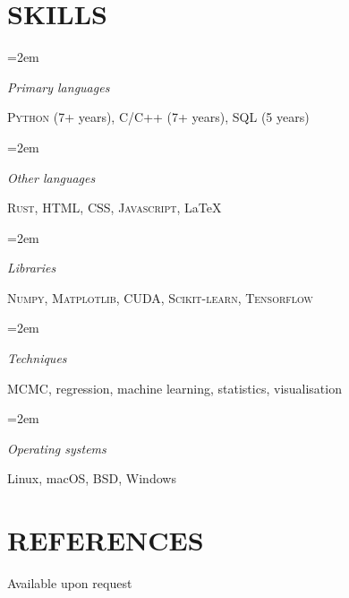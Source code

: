 \documentclass[paper=a4,fontsize=11pt]{scrartcl} %
\newlength{\spacebox}
\newlength{\skillbox}
\newcommand{\NewPart}[1]{\section*{\uppercase{#1}}}
\newcommand{\PersonalEntry}[2]{
		\noindent\hangindent=2em\hangafter=0 %
		\parbox{\spacebox}{        %
		\textit{#1}}		       %
		\hspace{1.5em} #2 \par}    %
\newcommand{\SkillsEntry}[2]{      %
		\noindent\hangindent=2em\hangafter=0 %
		\parbox{\skillbox}{        %
		\textit{#1}}			   %
		\hspace{1.5em} #2 \par}    %
\begin{document}
\NewPart{Skills}{}

\SkillsEntry{Primary \mbox{languages}}{\textsc{Python} (7+ years), \textsc{C/C++} (7+ years), \textsc{SQL} (5 years)}
\SkillsEntry{Other \mbox{languages}}{\textsc{Rust}, \textsc{HTML}, \textsc{CSS}, \textsc{Javascript}, \LaTeX}
\SkillsEntry{Libraries}{\textsc{Numpy}, \textsc{Matplotlib}, \textsc{CUDA}, \textsc{Scikit-learn}, \mbox{\textsc{Tensorflow}}}
\SkillsEntry{Techniques}{MCMC, regression, machine learning, statistics, visualisation}
\SkillsEntry{Operating systems}{Linux, macOS, BSD, Windows}


\NewPart{References}{}
Available upon request
\end{document}
